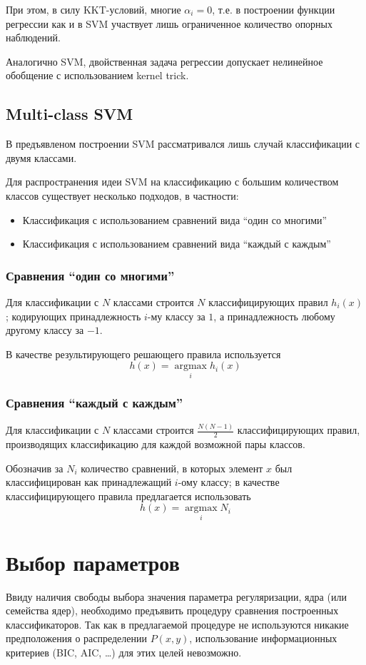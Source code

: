 \documentclass[11pt, a4paper]{article}\usepackage[]{graphicx}\usepackage[]{color}
\DeclareMathOperator*{\argmax}{argmax}
\begin{document}
При этом, в силу KKT-условий, многие $\alpha_i=0$, т.е. в построении функции регрессии как и в SVM участвует
лишь ограниченное количество опорных наблюдений.

Аналогично SVM, двойственная задача регрессии допускает нелинейное обобщение с использованием kernel trick.

\subsection{Multi-class SVM}
В предъявленом построении SVM рассматривался лишь случай классификации с двумя классами.

Для распространения идеи SVM на классификацию с большим количеством классов существует несколько подходов, в частности:
\begin{itemize}
	\item Классификация с использованием сравнений вида ``один со многими''
	\item Классификация с использованием сравнений вида ``каждый с каждым''
\end{itemize}

\subsubsection{Сравнения ``один со многими''}
Для классификации с $N$ классами строится $N$ классифицирующих правил $h_i\left(x\right)$; кодирующих принадлежность $i$-му классу за $1$, 
а принадлежность любому другому классу за $-1$.

В качестве результирующего решающего правила используется
\[
h\left(x\right)=\argmax\limits_i h_i\left(x\right)
\]

\subsubsection{Сравнения ``каждый с каждым''}
Для классификации с $N$ классами строится $\frac{N\left(N-1\right)}{2}$ классифицирующих правил, производящих классификацию
для каждой возможной пары классов.

Обозначив за $N_i$ количество сравнений, в которых элемент $x$ был классифицирован как принадлежащий $i$-ому классу; в качестве
классифицирующего правила предлагается использовать 
\[
h\left(x\right)=\argmax\limits_i N_i
\]



\section{Выбор параметров}
Ввиду наличия свободы выбора значения параметра регуляризации, ядра (или семейства ядер), необходимо
предъявить процедуру сравнения построенных классификаторов. Так как в предлагаемой процедуре не используются
никакие предположения о распределении $P(x, y)$, использование информационных критериев (BIC, AIC, \dots) для
этих целей невозможно.
\end{document}
